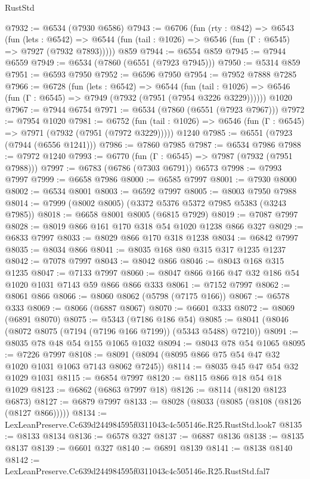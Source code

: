\begin{lexlean}{RustStd}
\begin{coremodule}
@7932 := @6534 (@7930 @6586)
@7943 := @6706
    (fun (rty : @842) =>
    @6543
      (fun (lets : @6542) =>
      @6544 (fun (tail : @1026) => @6546 (fun (Γ : @6545) => @7927 (@7932 @7893)))))
    @859
@7944 := @6554 @859
@7945 := @7944 @6559
@7949 := @6534 (@7860 (@6551 (@7923 @7945)))
@7950 := @5314 @859
@7951 := @6593 @7950
@7952 := @6596 @7950
@7954 := @7952 @7888 @7285
@7966 := @6728
    (fun (lets : @6542) =>
    @6544
      (fun (tail : @1026) => @6546 (fun (Γ : @6545) => @7949 (@7932 (@7951 (@7954 @3226 @3229))))))
    @1020
@7967 := @7944 @6754
@7971 := @6534 (@7860 (@6551 (@7923 @7967)))
@7972 := @7954 @1020
@7981 := @6752
    (fun (tail : @1026) => @6546 (fun (Γ : @6545) => @7971 (@7932 (@7951 (@7972 @3229)))))
    @1240
@7985 := @6551 (@7923 (@7944 (@6556 @1241)))
@7986 := @7860 @7985
@7987 := @6534 @7986
@7988 := @7972 @1240
@7993 := @6770 (fun (Γ : @6545) => @7987 (@7932 (@7951 @7988)))
@7997 := @6783 (@6786 (@7303 @6791)) @6573
@7998 := @7993 @7997
@7999 := @6658 @7986
@8000 := @6585 @7997
@8001 := @7930 @8000
@8002 := @6534 @8001
@8003 := @6592 @7997
@8005 := @8003 @7950 @7988
@8014 := @7999 (@8002 @8005) (@3372 @5376 @5372 @7985 @5383 (@3243 @7985))
@8018 := @6658 @8001 @8005 (@6815 @7929)
@8019 := @7087 @7997
@8028 := @8019 @866 @161 @170 @318 @54 @1020 @1238 @866 @327
@8029 := @6833 @7997
@8033 := @8029 @866 @170 @318 @1238
@8034 := @6842 @7997
@8035 := @8034 @866
@8041 := @8035 @168 @80 @315 @317 @1235 @1237
@8042 := @7078 @7997
@8043 := @8042 @866
@8046 := @8043 @168 @315 @1235
@8047 := @7133 @7997
@8060 := @8047 @866 @166 @47 @32 @186 @54 @1020 @1031 @7143 @59 @866 @866 @333
@8061 := @7152 @7997
@8062 := @8061 @866
@8066 := @8060 @8062 (@5798 (@7175 @166))
@8067 := @6578 @333
@8069 := @8066 (@6887 @8067)
@8070 := @6601 @333
@8072 := @8069 (@6891 @8070)
@8075 := @5343 (@7186 @186 @54)
@8085 := @8041 (@8046 (@8072 @8075 (@7194 (@7196 @166 @7199)) (@5343 @5488) @7210))
@8091 := @8035 @78 @48 @54 @155 @1065 @1032
@8094 := @8043 @78 @54 @1065
@8095 := @7226 @7997
@8108 := @8091 (@8094 (@8095 @866 @75 @54 @47 @32 @1020 @1031 @1063 @7143 @8062 @7245))
@8114 := @8035 @45 @47 @54 @32 @1029 @1031
@8115 := @6854 @7997
@8120 := @8115 @866 @18 @54 @18 @1029
@8123 := @6862 (@6863 @7997 @18)
@8126 := @8114 (@8120 @8123 @6873)
@8127 := @6879 @7997
@8133 := @8028 (@8033 (@8085 (@8108 (@8126 (@8127 @866)))))
@8134 := LexLeanPreserve.Cc639d244984595f0311043c4c505146e.R25.RustStd.look7
@8135 := @8133 @8134
@8136 := @6578 @327
@8137 := @6887 @8136
@8138 := @8135 @8137
@8139 := @6601 @327
@8140 := @6891 @8139
@8141 := @8138 @8140
@8142 := LexLeanPreserve.Cc639d244984595f0311043c4c505146e.R25.RustStd.fal7

\end{coremodule}
\end{lexlean}
